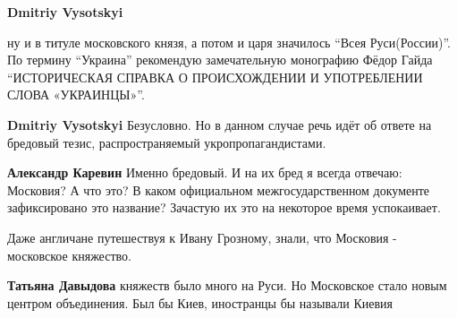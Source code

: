\begin{itemize}
\begin{itemize}
 
\textbf{Dmitriy Vysotskyi} 

ну и в титуле московского князя, а потом и царя значилось \enquote{Всея Руси(России)}. По
термину \enquote{Украина} рекомендую замечательную монографию Фёдор Гайда \enquote{ИСТОРИЧЕСКАЯ
СПРАВКА О ПРОИСХОЖДЕНИИ И УПОТРЕБЛЕНИИ СЛОВА «УКРАИНЦЫ»}.


 
\textbf{Dmitriy Vysotskyi} Безусловно. Но в данном случае речь идёт об ответе на бредовый тезис, распространяемый укропропагандистами.

 
\textbf{Александр Каревин} Именно бредовый. И на их бред я всегда отвечаю: Московия? А что это? В каком официальном межгосударственном документе зафиксировано это название? Зачастую их это на некоторое время успокаивает.
\end{itemize}

 
Даже англичане путешествуя к Ивану Грозному, знали, что Московия - московское княжество.

\begin{itemize}
 
\textbf{Татьяна Давыдова} княжеств было много на Руси. Но Московское стало новым центром объединения. Был бы Киев, иностранцы бы называли Киевия


\end{itemize}
\end{itemize}
